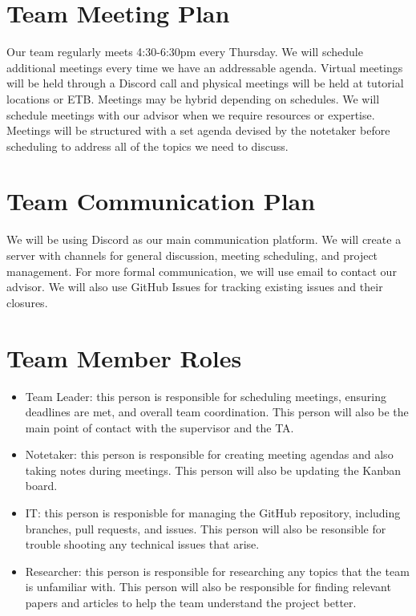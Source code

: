 \documentclass{article}
\begin{document}
\section{Team Meeting Plan}

\raggedright
Our team regularly meets 4:30-6:30pm every Thursday.
We will schedule additional meetings every time we have an addressable 
agenda. Virtual meetings will be held through a Discord call 
and physical meetings will be held at tutorial locations or ETB.
 Meetings may be hybrid depending on schedules. We will schedule
  meetings with our advisor when we require resources or 
  expertise. Meetings will be structured with a set agenda devised by the notetaker
  before scheduling to address all of the topics we need to discuss.

\section{Team Communication Plan}

\raggedright
We will be using Discord as our main communication 
platform. We will create a server with channels for general 
discussion, meeting scheduling, and project management.
For more formal communication, we will use email to contact 
our advisor.
We will also use GitHub Issues for tracking existing 
issues and their closures.


\section{Team Member Roles}

\raggedright
\begin{itemize}
  \item Team Leader: this person is responsible for scheduling meetings,
    ensuring deadlines are met, and overall team coordination. This person will
    also be the main point of contact with the supervisor and the TA.
  \item Notetaker: this person is responsible for creating meeting agendas and also
    taking notes during meetings. This person will also be updating the Kanban
    board.
  \item IT: this person is responisble for managing the GitHub repository, including
    branches, pull requests, and issues. This person will also be resonsible for trouble
    shooting any technical issues that arise.
  \item Researcher: this person is responsible for researching any topics that
    the team is unfamiliar with. This person will also be responsible for finding
    relevant papers and articles to help the team understand the project better.
\end{itemize}
\end{document}
